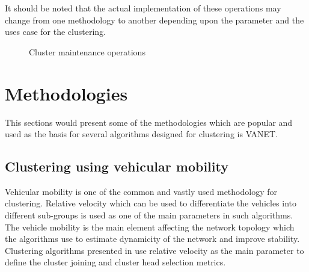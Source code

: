 \documentclass[]{ccs-thesis}
\begin{document}
It should be noted that the actual implementation of these operations may change from one methodology to another depending upon the parameter and the
uses case for the clustering.

\begin{figure}[h]
	\centering
    \vfill%
    
	\caption{Cluster maintenance operations}
	\label{fig:maintenance}
\end{figure}

\section{Methodologies}

This sections would present some of the methodologies which are popular and used as the basis for several algorithms designed for clustering
is \ac{VANET}.

\subsection{Clustering using vehicular mobility}

Vehicular mobility is one of the common and vastly used methodology for clustering. Relative velocity which can be used to differentiate
the vehicles into different sub-groups is used as one of the main parameters in such algorithms. The vehicle mobility is the main element
affecting the network topology which the algorithms use to estimate dynamicity of the network and improve stability. Clustering algorithms
presented in \cite{ARKIAN2014197, 6737622, 6077004} use relative velocity as the main parameter to define the cluster joining and cluster
head selection metrics.
\end{document}
